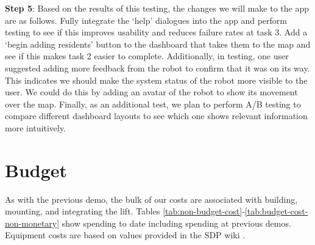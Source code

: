 \documentclass{article}
\begin{document}
{\bf Step 5}: Based on the results of this testing, the changes we will make to the app are as follows. Fully integrate the `help' dialogues into the app and perform testing to see if this improves usability and reduces failure rates at task 3. Add a `begin adding residents' button to the dashboard that takes them to the map and see if this makes task 2 easier to complete. Additionally, in testing, one user suggested adding more feedback from the robot to confirm that it was on its way. This indicates we should make the system status of the robot more visible to the user. We could do this by adding an avatar of the robot to show its movement over the map. Finally, as an additional test, we plan to perform A/B testing to compare different dashboard layouts to see which one shows relevant information more intuitively. 

\section{Budget}
As with the previous demo, the bulk of our costs are associated with building, mounting, and integrating the lift. Tables \ref{tab:non-budget-cost}-\ref{tab:budget-cost-non-monetary} show spending to date including spending at previous demos. Equipment costs are based on values provided in the SDP wiki \cite{sdpcosts}.

\begin{table}[h]
\begin{center}
\caption{Non-budgeted monetary costs at demo \demoNumber. Note that we have chosen to stop using the EV3 and instead use the Arduino kit.}
\label{tab:non-budget-cost}
\end{center}
\end{table}
\end{document}
